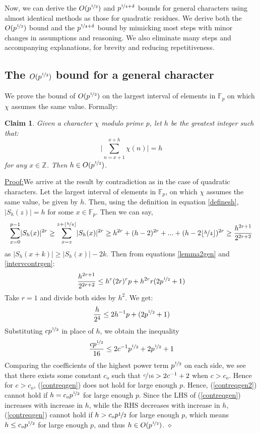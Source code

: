 \documentclass{report}
\newtheorem*{claim*}{Claim}
\newenvironment{claimproof}[1]{\vspace{2.5mm}\par\noindent\underline{Proof:}\space#1}{\hfill $\diamond$ \vspace{2.5mm} \par}
\begin{document}
Now, we can derive the $O(p^{\nicefrac{1}{2}})$ and $p^{\nicefrac{1}{4}+\delta}$ bounds for general characters using almost identical methods as those for quadratic residues. We derive both the $O(p^{\nicefrac{1}{2}})$ bound and the $p^{\nicefrac{1}{4}+\delta}$ bound by mimicking most steps with minor changes in assumptions and reasoning. We also eliminate many steps and accompanying explanations, for brevity and reducing repetitiveness.
\subsection{The $O(p^{\nicefrac{1}{2}})$ bound for a general character}
We prove the bound of $O(p^{\nicefrac{1}{2}})$ on the largest interval of elements in $\mathbb{F}_p$ on which $\chi$ assumes the same value. Formally:
\begin{claim*}
Given a character $\chi$ modulo prime $p$, let $h$ be the greatest integer such that:
\[\bigg\lvert\sum\limits_{n=x+1}^{x+h}\chi(n)\bigg\rvert=h\]
 for any $x\in\mathbb{Z}$. Then $h\in O(p^{\nicefrac{1}{2}})$.
\end{claim*}
\begin{claimproof}
We arrive at the result by contradiction as in the case of quadratic characters. Let the largest interval of elements in $\mathbb{F}_p$, on which $\chi$ assumes the same value, be given by $h$. Then, using the definition in equation \ref{definesh}, $\lvert S_h(z)\rvert=h$ for some $x\in\mathbb{F}_p$. Then we can say,
\begin{equation} \label{intervcontrgen}
\sum\limits_{x=0}^{p-1}\lvert S_h(x)\rvert^{2r}\geq\sum\limits_{x=z}^{z+\lfloor\nicefrac{h}{4}\rfloor}\lvert S_h(x)\rvert^{2r} \geq h^{2r}+(h-2)^{2r}+...+(h-2\lfloor\nicefrac{h}{4}\rfloor)^{2r} \geq \frac{h^{2r+1}}{2^{2r+2}}
\end{equation}
as $\lvert S_h(x+k)\rvert \geq \lvert S_h(x)\rvert-2k$. Then from equations \ref{lemma2gen} and \ref{intervcontrgen}:
$$ \frac{h^{2r+1}}{2^{2r+2}} \leq h^{r}(2r)^{r}p+h^{2r}r(2p^{\nicefrac{1}{2}}+1)$$
Take $r=1$ and divide both sides by $h^{2}$. We get:
\begin{equation} \label{contreqgen}
\frac{h}{2^{4}} \leq 2h^{-1}p+(2p^{\nicefrac{1}{2}}+1)
\end{equation}
Substituting $cp^{\nicefrac{1}{2}}$ in place of $h$, we obtain the inequality
\begin{equation} \label{contreqgen2}
\frac{cp^{\nicefrac{1}{2}}}{16} \leq 2c^{-1}p^{\nicefrac{1}{2}}+2p^{\nicefrac{1}{2}}+1
\end{equation}
Comparing the coefficients of the highest power term $p^{\nicefrac{1}{2}}$ on each side, we see that there exists some constant $c_o$ such that $\nicefrac{c}{16}>2c^{-1}+2$ when $c>c_o$. Hence for $c>c_o$, (\ref{contreqgen}) does not hold for large enough $p$. Hence, (\ref{contreqgen2}) cannot hold if $h=c_op^{\nicefrac{1}{2}}$ for large enough $p$. Since the LHS of (\ref{contreqgen}) increases with increase in $h$, while the RHS decreases with increase in $h$, (\ref{contreqgen}) cannot hold if $h>c_op{\nicefrac{1}{2}}$ for large enough $p$, which means $h\leq c_op^{\nicefrac{1}{2}}$ for large enough $p$, and thus $h\in O(p^{\nicefrac{1}{2}})$.
\end{claimproof}
\end{document}
